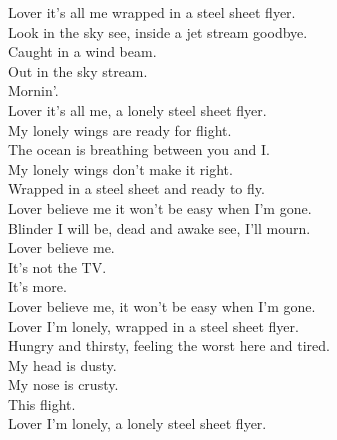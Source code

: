 Lover it's all me wrapped in a steel sheet flyer. \\
Look in the sky see, inside a jet stream goodbye. \\
Caught in a wind beam. \\
Out in the sky stream. \\
Mornin'. \\
Lover it's all me, a lonely steel sheet flyer. \\

My lonely wings are ready for flight. \\
The ocean is breathing between you and I. \\
My lonely wings don't make it right. \\
Wrapped in a steel sheet and ready to fly. \\

Lover believe me it won't be easy when I'm gone. \\
Blinder I will be, dead and awake see, I'll mourn. \\
Lover believe me. \\
It's not the TV. \\
It's more. \\
Lover believe me, it won't be easy when I'm gone. \\

Lover I'm lonely, wrapped in a steel sheet flyer. \\
Hungry and thirsty, feeling the worst here and tired. \\
My head is dusty. \\
My nose is crusty. \\
This flight. \\
Lover I'm lonely, a lonely steel sheet flyer. \\
